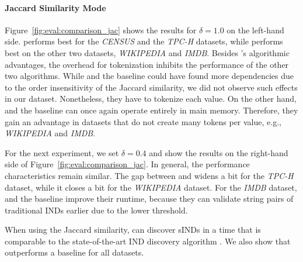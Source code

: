\paragraph{Jaccard Similarity Mode}
Figure~\ref{fig:eval:comparison_jac} shows the results for $\delta = 1.0$ on the left-hand side.
 performs best for the \emph{CENSUS} and the \emph{TPC-H} datasets, while \sawfish performs best on the other two datasets, \emph{WIKIPEDIA} and \emph{IMDB}.
Besides 's algorithmic advantages, the overhead for tokenization inhibits the performance of the other two algorithms.
While \sawfish and the baseline could have found more dependencies due to the order insensitivity of the Jaccard similarity, we did not observe such effects in our dataset.
Nonetheless, they have to tokenize each value.
On the other hand, \sawfish and the baseline can once again operate entirely in main memory.
Therefore, they gain an advantage in datasets that do not create many tokens per value, e.g., \emph{WIKIPEDIA} and \emph{IMDB}.

For the next experiment, we set $\delta = 0.4$ and show the results on the right-hand side of Figure~\ref{fig:eval:comparison_jac}.
In general, the performance characteristics remain similar.
The gap between \sawfish and  widens a bit for the \emph{TPC-H} dataset, while it closes a bit for the \emph{WIKIPEDIA} dataset. 
For the \emph{IMDB} dataset, \sawfish and the baseline improve their runtime, because they can validate string pairs of traditional INDs earlier due to the lower threshold.

When using the Jaccard similarity, \sawfish can discover sINDs in a time that is comparable to the state-of-the-art IND discovery algorithm .
We also show that \sawfish outperforms a baseline for all datasets.

